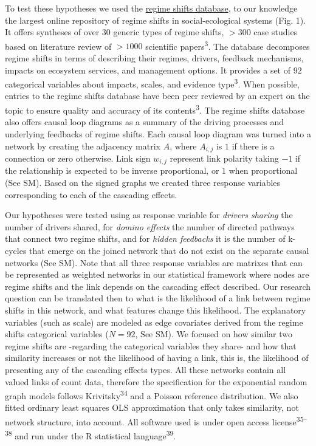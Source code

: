 \documentclass[9pt,]{article}
\begin{document}
To test these hypotheses we used the \href{www.regimeshifts.org}{regime
shifts database}, to our knowledge the largest online repository of
regime shifts in social-ecological systems (Fig. 1). It offers syntheses
of over \(30\) generic types of regime shifts, \(> 300\) case studies
based on literature review of \(> 1000\) scientific
papers\textsuperscript{3}. The database decomposes regime shifts in
terms of describing their regimes, drivers, feedback mechanisms, impacts
on ecosystem services, and management options. It provides a set of
\(92\) categorical variables about impacts, scales, and evidence
type\textsuperscript{3}. When possible, entries to the regime shifts
database have been peer reviewed by an expert on the topic to ensure
quality and accuracy of its contents\textsuperscript{3}. The regime
shifts database also offers causal loop diagrams as a summary of the
driving processes and underlying feedbacks of regime shifts. Each causal
loop diagram was turned into a network by creating the adjacency matrix
\(A\), where \(A_{i,j}\) is \(1\) if there is a connection or zero
otherwise. Link sign \(w_{i,j}\) represent link polarity taking \(-1\)
if the relationship is expected to be inverse proportional, or \(1\)
when proportional (See SM). Based on the signed graphs we created three
response variables corresponding to each of the cascading effects.

Our hypotheses were tested using as response variable for \emph{drivers
sharing} the number of drivers shared, for \emph{domino effects} the
number of directed pathways that connect two regime shifts, and for
\emph{hidden feedbacks} it is the number of k-cycles that emerge on the
joined network that do not exist on the separate causal networks (See
SM). Note that all three response variables are matrixes that can be
represented as weighted networks in our statistical framework where
nodes are regime shifts and the link depends on the cascading effect
described. Our research question can be translated then to what is the
likelihood of a link between regime shifts in this network, and what
features change this likelihood. The explanatory variables (such as
scale) are modeled as edge covariates derived from the regime shifts
categorical variables (\(N=92\), See SM). We focused on how similar two
regime shifts are -regarding the categorical variables they share- and
how that similarity increases or not the likelihood of having a link,
this is, the likelihood of presenting any of the cascading effects
types. All these networks contain all valued links of count data,
therefore the specification for the exponential random graph models
follows Krivitsky\textsuperscript{34} and a Poisson reference
distribution. We also fitted ordinary least squares OLS approximation
that only takes similarity, not network structure, into account. All
software used is under open access license\textsuperscript{35--38} and
run under the R statistical language\textsuperscript{39}.
\end{document}
